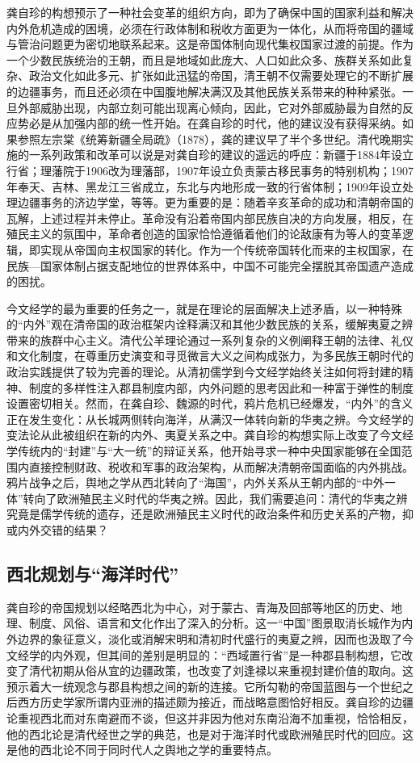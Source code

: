 \documentclass[a4paper, 12pt, openright]{ctexbook}
\begin{document}
龚自珍的构想预示了一种社会变革的组织方向，即为了确保中国的国家利益和解决内外危机造成的困境，必须在行政体制和税收方面更为一体化，从而将帝国的疆域与管治问题更为密切地联系起来。这是帝国体制向现代集权国家过渡的前提。作为一个少数民族统治的王朝，而且是地域如此庞大、人口如此众多、族群关系如此复杂、政治文化如此多元、扩张如此迅猛的帝国，清王朝不仅需要处理它的不断扩展的边疆事务，而且还必须在中国腹地解决满汉及其他民族关系带来的种种紧张。一旦外部威胁出现，内部立刻可能出现离心倾向，因此，它对外部威胁最为自然的反应势必是从加强内部的统一性开始。在龚自珍的时代，他的建议没有获得采纳。如果参照左宗棠《统筹新疆全局疏》（1878），龚的建议早了半个多世纪。清代晚期实施的一系列政策和改革可以说是对龚自珍的建议的遥远的呼应：新疆于1884年设立行省；理藩院于1906改为理藩部，1907年设立负责蒙古移民事务的特别机构；1907年奉天、吉林、黑龙江三省成立，东北与内地形成一致的行省体制；1909年设立处理边疆事务的济边学堂，等等。更为重要的是：随着辛亥革命的成功和清朝帝国的瓦解，上述过程并未停止。革命没有沿着帝国内部民族自决的方向发展，相反，在殖民主义的氛围中，革命者创造的国家恰恰遵循着他们的论敌康有为等人的变革逻辑，即实现从帝国向主权国家的转化。作为一个传统帝国转化而来的主权国家，在民族—国家体制占据支配地位的世界体系中，中国不可能完全摆脱其帝国遗产造成的困扰。

今文经学的最为重要的任务之一，就是在理论的层面解决上述矛盾，以一种特殊的“内外”观在清帝国的政治框架内诠释满汉和其他少数民族的关系，缓解夷夏之辨带来的族群中心主义。清代公羊理论通过一系列复杂的义例阐释王朝的法律、礼仪和文化制度，在尊重历史演变和寻觅微言大义之间构成张力，为多民族王朝时代的政治实践提供了较为完善的理论。从清初儒学到今文经学始终关注如何将封建的精神、制度的多样性注入郡县制度内部，内外问题的思考因此和一种富于弹性的制度设置密切相关。然而，在龚自珍、魏源的时代，鸦片危机已经爆发，“内外”的含义正在发生变化：从长城两侧转向海洋，从满汉一体转向新的华夷之辨。今文经学的变法论从此被组织在新的内外、夷夏关系之中。龚自珍的构想实际上改变了今文经学传统内的“封建”与“大一统”的辩证关系，他开始寻求一种中央国家能够在全国范围内直接控制财政、税收和军事的政治架构，从而解决清朝帝国面临的内外挑战。鸦片战争之后，舆地之学从西北转向了“海国”，内外关系从王朝内部的“中外一体”转向了欧洲殖民主义时代的华夷之辨。因此，我们需要追问：清代的华夷之辨究竟是儒学传统的遗存，还是欧洲殖民主义时代的政治条件和历史关系的产物，抑或内外交错的结果？

\subsection{西北规划与“海洋时代”}

龚自珍的帝国规划以经略西北为中心，对于蒙古、青海及回部等地区的历史、地理、制度、风俗、语言和文化作出了深入的分析。这一“中国”图景取消长城作为内外边界的象征意义，淡化或消解宋明和清初时代盛行的夷夏之辨，因而也汲取了今文经学的内外观，但其间的差别是明显的：“西域置行省”是一种郡县制构想，它改变了清代初期从俗从宜的边疆政策，也改变了刘逢禄以来重视封建价值的取向。这预示着大一统观念与郡县构想之间的新的连接。它所勾勒的帝国蓝图与一个世纪之后西方历史学家所谓内亚洲的描述颇为接近，而战略意图恰好相反。龚自珍的边疆论重视西北而对东南避而不谈，但这并非因为他对东南沿海不加重视，恰恰相反，他的西北论是清代经世之学的典范，也是对于海洋时代或欧洲殖民时代的回应。这是他的西北论不同于同时代人之舆地之学的重要特点。
\end{document}
